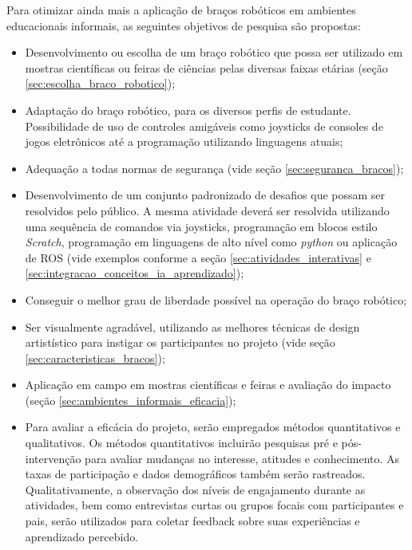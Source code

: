 \documentclass[%
  a4paper,%
  12pt,%
  fleqn,%
  english,%
  brazilian,%
]{article}
\begin{document}
Para otimizar ainda mais a aplicação de braços robóticos em ambientes educacionais informais, as seguintes objetivos de pesquisa são propostas:
	\begin{itemize}
		\item Desenvolvimento ou escolha de um braço robótico que possa ser utilizado em mostras científicas ou feiras de ciências pelas diversas faixas etárias (seção \ref{sec:escolha_braco_robotico});
		\item Adaptação do braço robótico, para os diversos perfis de estudante. Possibilidade de uso de controles amigáveis como joysticks de consoles de jogos eletrônicos até a programação utilizando linguagens atuais;
		\item Adequação a todas normas de segurança (vide seção \ref{sec:seguranca_bracos});
		\item Desenvolvimento de um conjunto padronizado de desafios que possam ser resolvidos pelo público. A mesma atividade deverá ser resolvida utilizando uma sequência de comandos via joysticks, programação em blocos estilo \emph{Scratch}, programação em linguagens de alto nível como \emph{python} ou aplicação de ROS (vide exemplos conforme a seção \ref{sec:atividades_interativas} e \ref{sec:integracao_conceitos_ia_aprendizado});
		\item Conseguir o melhor grau de liberdade possível na operação do braço robótico;
		\item Ser visualmente agradável, utilizando as melhores técnicas de design artistístico para instigar os participantes no projeto (vide seção \ref{sec:caracteristicas_bracos});
		\item Aplicação em campo em mostras científicas e feiras e avaliação do impacto (seção \ref{sec:ambientes_informais_eficacia});
		\item Para avaliar a eficácia do projeto, serão empregados métodos quantitativos e qualitativos. Os métodos quantitativos incluirão pesquisas pré e pós-intervenção para avaliar mudanças no interesse, atitudes e conhecimento. As taxas de participação e dados demográficos também serão rastreados. Qualitativamente, a observação dos níveis de engajamento durante as atividades, bem como entrevistas curtas ou grupos focais com participantes e pais, serão utilizados para coletar feedback sobre suas experiências e aprendizado percebido.
	\end{itemize}
	
\end{document}

